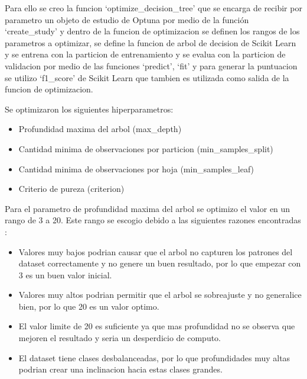 \documentclass[12pt,a4paper]{article}
\begin{document}
Para ello se creo la funcion `optimize_decision_tree' que se encarga de recibir por
parametro un objeto de estudio de Optuna por medio de la función `create_study' y dentro de la funcion
de optimizacion se definen los rangos de los parametros a optimizar,
se define la funcion de arbol de decision de Scikit Learn y se entrena
con la particion de entrenamiento y se evalua con la particion de validacion
por medio de las funciones `predict', `fit' y
para generar la puntuacion se utilizo `f1_score' de Scikit Learn que tambien
es utilizada como salida de la funcion de optimizacion.

Se optimizaron los siguientes hiperparametros:

\begin{itemize}
  \item Profundidad maxima del arbol (max\_depth)
  \item Cantidad minima de observaciones por particion (min\_samples\_split)
  \item Cantidad minima de observaciones por hoja (min\_samples\_leaf)
  \item Criterio de pureza (criterion)
\end{itemize}

Para el parametro de profundidad maxima del arbol se optimizo el valor en un rango de 3 a 20. Este rango se escogio debido
a las siguientes razones encontradas \autocite{sklearnerConfigureDecisionTreeClassifierMax_depth,scikitlearnDecisionTrees,christinaellisMaxDepthRandom2022}:
\begin{itemize}
  \item Valores muy bajos podrian causar que el arbol no capturen los patrones del dataset correctamente y no genere un buen resultado,
    por lo que empezar con 3 es un buen valor inicial.
  \item Valores muy altos podrian permitir que el arbol se sobreajuste y no generalice bien, por lo que 20 es un valor optimo.
  \item El valor limite de 20 es suficiente ya que mas profundidad no se observa que mejoren el resultado y seria un desperdicio de computo.
  \item El dataset tiene clases desbalanceadas, por lo que profundidades muy altas podrian crear una inclinacion hacia estas clases grandes.
\end{itemize}
\end{document}
